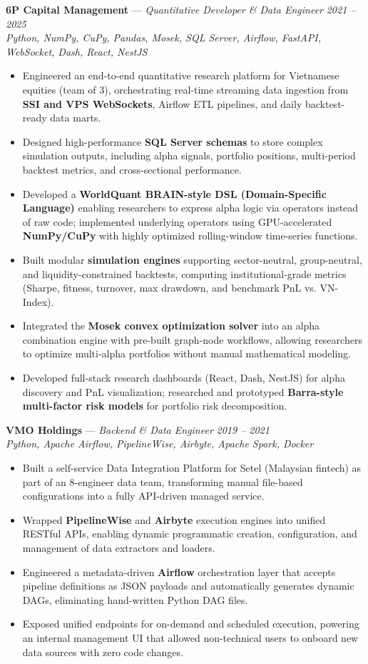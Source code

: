 \documentclass[9pt,a4paper]{extarticle}
\begin{document}
\noindent\textbf{6P Capital Management} --- \textit{Quantitative Developer \& Data Engineer} \hfill \textit{2021 -- 2025}\\
\textit{Python, NumPy, CuPy, Pandas, Mosek, SQL Server, Airflow, FastAPI, WebSocket, Dash, React, NestJS}
\begin{itemize}
    \item Engineered an end-to-end quantitative research platform for Vietnamese equities (team of 3), orchestrating real-time streaming data ingestion from \textbf{SSI and VPS WebSockets}, Airflow ETL pipelines, and daily backtest-ready data marts.
    \item Designed high-performance \textbf{SQL Server schemas} to store complex simulation outputs, including alpha signals, portfolio positions, multi-period backtest metrics, and cross-sectional performance.
    \item Developed a \textbf{WorldQuant BRAIN-style DSL (Domain-Specific Language)} enabling researchers to express alpha logic via operators instead of raw code; implemented underlying operators using GPU-accelerated \textbf{NumPy/CuPy} with highly optimized rolling-window time-series functions.
    \item Built modular \textbf{simulation engines} supporting sector-neutral, group-neutral, and liquidity-constrained backtests, computing institutional-grade metrics (Sharpe, fitness, turnover, max drawdown, and benchmark PnL vs. VN-Index).
    \item Integrated the \textbf{Mosek convex optimization solver} into an alpha combination engine with pre-built graph-node workflows, allowing researchers to optimize multi-alpha portfolios without manual mathematical modeling.
    \item Developed full-stack research dashboards (React, Dash, NestJS) for alpha discovery and PnL visualization; researched and prototyped \textbf{Barra-style multi-factor risk models} for portfolio risk decomposition.
\end{itemize}
\noindent\textbf{VMO Holdings} --- \textit{Backend \& Data Engineer} \hfill \textit{2019 -- 2021}\\
\textit{Python, Apache Airflow, PipelineWise, Airbyte, Apache Spark, Docker}
\begin{itemize}
    \item Built a self-service Data Integration Platform for Setel (Malaysian fintech) as part of an 8-engineer data team, transforming manual file-based configurations into a fully API-driven managed service.
    \item Wrapped \textbf{PipelineWise} and \textbf{Airbyte} execution engines into unified RESTful APIs, enabling dynamic programmatic creation, configuration, and management of data extractors and loaders.
    \item Engineered a metadata-driven \textbf{Airflow} orchestration layer that accepts pipeline definitions as JSON payloads and automatically generates dynamic DAGs, eliminating hand-written Python DAG files.
    \item Exposed unified endpoints for on-demand and scheduled execution, powering an internal management UI that allowed non-technical users to onboard new data sources with zero code changes.
\end{itemize}
\end{document}
